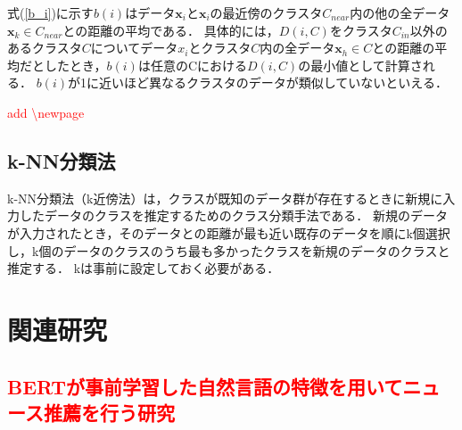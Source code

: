 \documentclass[12pt,a4j]{jreport}
\begin{document}
式(\ref{b_i})に示す$b(i)$はデータ$\bm{x}_i$と$\bm{x}_i$の最近傍のクラスタ$C_{near}$内の他の全データ$\bm{x}_k \in C_{near}$との距離の平均である．
具体的には，$D(i, C)$をクラスタ$C_{in}$以外のあるクラスタ$C$についてデータ$x_i$とクラスタ$C$内の全データ$\bm{x}_h \in C$との距離の平均だとしたとき，$b(i)$は任意のCにおける$D(i, C)$の最小値として計算される．
$b(i)$が1に近いほど異なるクラスタのデータが類似していないといえる．




\textcolor{red}{add \textbackslash newpage}
\newpage

\section{k-NN分類法}
k-NN分類法（k近傍法）は，クラスが既知のデータ群が存在するときに新規に入力したデータのクラスを推定するためのクラス分類手法である\cite{aurellen20}．
新規のデータが入力されたとき，そのデータとの距離が最も近い既存のデータを順にk個選択し，k個のデータのクラスのうち最も多かったクラスを新規のデータのクラスと推定する．
kは事前に設定しておく必要がある．


\chapter{関連研究}
\label{chapter_related_studies}


\section{\textcolor{red}{BERTが事前学習した自然言語の特徴を用いてニュース推薦を行う研究}}

\end{document}
